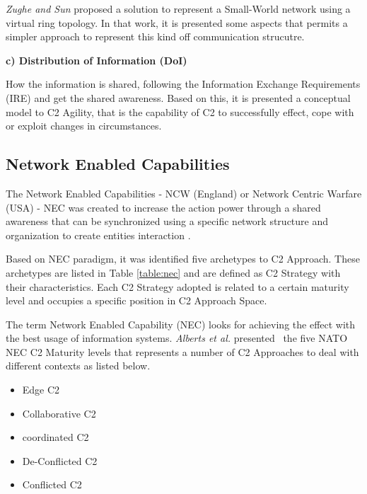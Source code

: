 \textit{Zughe and Sun} \cite{small02} proposed a solution to represent a Small-World network using a virtual ring topology. In that work, it is presented some aspects that permits a simpler approach to represent this kind off communication strucutre.

\textbf{c) Distribution of Information (DoI)}

How the information is shared, following the Information Exchange Requirements (IRE) and get the shared awareness. Based on this, it is presented a conceptual model to C2 Agility, that is the capability of C2 to successfully effect, cope with or exploit changes in circumstances.\cite{ABAR201713} 




\subsection {Network Enabled Capabilities}

The Network Enabled Capabilities - NCW (England) or Network Centric Warfare (USA) - NEC was created to increase the action power through a shared awareness that can be synchronized using a specific network structure and organization to create entities interaction \cite{Alberts2000}. 

Based on NEC paradigm, it was identified five archetypes to C2 Approach. These archetypes are listed in Table \ref{table:nec} and are defined as \gls{C2 Strategy} with their characteristics. Each \gls{C2 Strategy} adopted is related to a certain maturity level and occupies a specific position in C2 Approach Space.



The term Network Enabled Capability (NEC) looks for achieving the effect with the best usage of information systems. \textit{Alberts et al.} presented~\cite{nato01} the five NATO NEC C2 Maturity levels that represents a number of C2 Approaches to deal with different contexts as listed below.

\begin{itemize}
    \item Edge C2
    \item Collaborative C2
    \item coordinated C2
    \item De-Conflicted C2
    \item Conflicted C2
\end{itemize}

